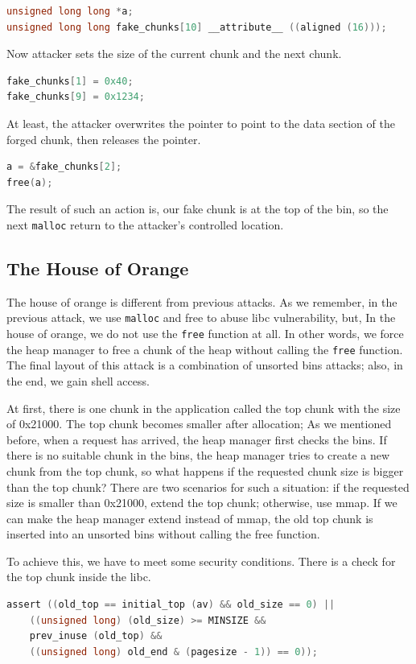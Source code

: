 \documentclass{masterthesis}
\newcommand*\ub{unsorted bins}
\newcommand*\mallocc{\lstinline{malloc}}
\newcommand*\freec{\lstinline{free}}
\begin{document}
\begin{lstlisting}[language=c,frame=tlrb]
unsigned long long *a;
unsigned long long fake_chunks[10] __attribute__ ((aligned (16)));
\end{lstlisting}

Now attacker sets the size of the current chunk and the next chunk.

\begin{lstlisting}[language=c,frame=tlrb]
fake_chunks[1] = 0x40;
fake_chunks[9] = 0x1234;
\end{lstlisting}

At least, the attacker overwrites the pointer to point to the data section of the forged chunk, then releases the pointer.

\begin{lstlisting}[language=c,frame=tlrb]
a = &fake_chunks[2];
free(a);
\end{lstlisting}

The result of such an action is, our fake chunk is at the top of the bin, so the next \mallocc{} return to the attacker's controlled location.

\subsection{The House of Orange}
The house of orange is different from previous attacks. As we remember, in the previous attack, we use \mallocc{} and free to abuse libc vulnerability, but, In the house of orange, we do not use the \freec{} function at all. In other words, we force the heap manager to free a chunk of the heap without calling the \freec{} function. The final layout of this attack is a combination of \ub{} attacks; also, in the end, we gain shell access.

At first, there is one chunk in the application called the top chunk with the size of 0x21000. The top chunk becomes smaller after allocation; As we mentioned before, when a request has arrived, the heap manager first checks the bins. If there is no suitable chunk in the bins, the heap manager tries to create a new chunk from the top chunk, so what happens if the requested chunk size is bigger than the top chunk? There are two scenarios for such a situation: if the requested size is smaller than 0x21000, extend the top chunk; otherwise, use mmap. If we can make the heap manager extend instead of mmap, the old top chunk is inserted into an \ub{} without calling the free function.

To achieve this, we have to meet some security conditions. There is a check for the top chunk inside the libc.
\begin{lstlisting}[language=c,frame=tlrb]
 assert ((old_top == initial_top (av) && old_size == 0) ||
	((unsigned long) (old_size) >= MINSIZE &&
	prev_inuse (old_top) &&
	((unsigned long) old_end & (pagesize - 1)) == 0));
\end{lstlisting}
\end{document}
